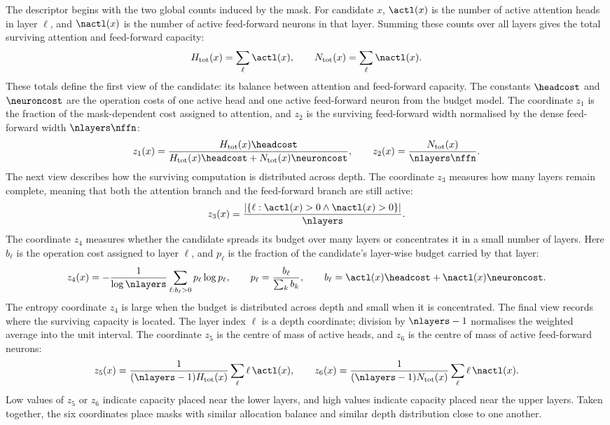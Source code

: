 The descriptor begins with the two global counts induced by the mask. For
candidate $x$, $\actl(x)$ is the number of active attention heads in layer
$\ell$, and $\nactl(x)$ is the number of active feed-forward neurons in that
layer. Summing these counts over all layers gives the total surviving
attention and feed-forward capacity:
\[
H_{\mathrm{tot}}(x)=\sum_{\ell}\actl(x),
\qquad
N_{\mathrm{tot}}(x)=\sum_{\ell}\nactl(x).
\]
These totals define the first view of the candidate: its balance between
attention and feed-forward capacity. The constants $\headcost$ and
$\neuroncost$ are the operation costs of one active head and one active
feed-forward neuron from the budget model. The coordinate $z_1$ is the
fraction of the mask-dependent cost assigned to attention, and $z_2$ is the
surviving feed-forward width normalised by the dense feed-forward width
$\nlayers\nffn$:
\[
z_1(x)
=
\frac{H_{\mathrm{tot}}(x)\headcost}
{H_{\mathrm{tot}}(x)\headcost+N_{\mathrm{tot}}(x)\neuroncost},
\qquad
z_2(x)
=
\frac{N_{\mathrm{tot}}(x)}{\nlayers\nffn}.
\]
The next view describes how the surviving computation is distributed across
depth. The coordinate $z_3$ measures how many layers remain complete, meaning
that both the attention branch and the feed-forward branch are still active:
\[
z_3(x)
=
\frac{\left|\{\ell:\actl(x)>0 \wedge \nactl(x)>0\}\right|}{\nlayers}.
\]
The coordinate $z_4$ measures whether the candidate spreads its budget over
many layers or concentrates it in a small number of layers. Here $b_\ell$ is
the operation cost assigned to layer $\ell$, and $p_\ell$ is the fraction of
the candidate's layer-wise budget carried by that layer:
\[
z_4(x)
=
-\frac{1}{\log \nlayers}
\sum_{\ell:b_\ell>0}p_\ell\log p_\ell,
\qquad
p_\ell=\frac{b_\ell}{\sum_k b_k},
\qquad
b_\ell=\actl(x)\headcost+\nactl(x)\neuroncost .
\]
The entropy coordinate $z_4$ is large when the budget is distributed across
depth and small when it is concentrated. The final view records where the
surviving capacity is located. The layer index $\ell$ is a depth coordinate;
division by $\nlayers-1$ normalises the weighted average into the unit
interval. The coordinate $z_5$ is the centre of mass of active heads, and
$z_6$ is the centre of mass of active feed-forward neurons:
\[
z_5(x)
=
\frac{1}{(\nlayers-1)H_{\mathrm{tot}}(x)}
\sum_{\ell}\ell\,\actl(x),
\qquad
z_6(x)
=
\frac{1}{(\nlayers-1)N_{\mathrm{tot}}(x)}
\sum_{\ell}\ell\,\nactl(x).
\]
Low values of $z_5$ or $z_6$ indicate capacity placed near the lower layers,
and high values indicate capacity placed near the upper layers. Taken
together, the six coordinates place masks with similar allocation balance and
similar depth distribution close to one another.

